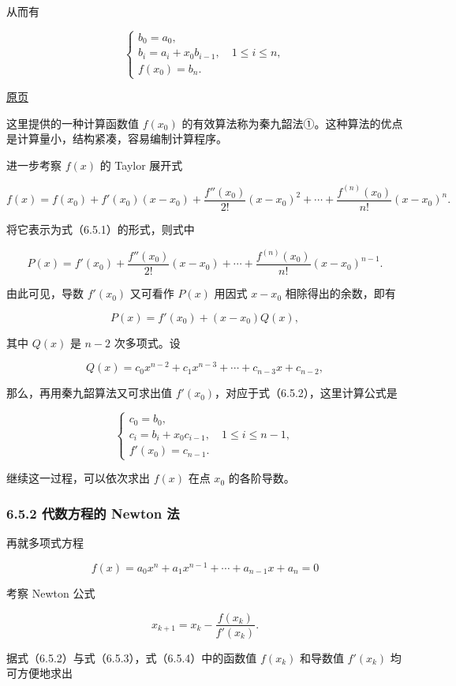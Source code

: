 \documentclass[
  10pt,
  fontset=fandol]{ctexart}
\begin{document}
从而有

\[
\begin{cases}
b_0=a_0,\\
b_i=a_i+x_0b_{i-1},\quad1\leqslant i\leqslant n,\\
f(x_0)=b_n.
\end{cases}
\tag{6.5.2}
\]

\href{../../source-images/pdf-172.jpeg}{原页}

这里提供的一种计算函数值 \(f(x_0)\) 的有效算法称为秦九韶法①。这种算法的优点是计算量小，结构紧凑，容易编制计算程序。

进一步考察 \(f(x)\) 的 Taylor 展开式

\[
f(x)=f(x_0)+f'(x_0)(x-x_0)+\frac{f''(x_0)}{2!}(x-x_0)^2+\cdots+\frac{f^{(n)}(x_0)}{n!}(x-x_0)^n.
\]

将它表示为式（6.5.1）的形式，则式中

\[
P(x)=f'(x_0)+\frac{f''(x_0)}{2!}(x-x_0)+\cdots+\frac{f^{(n)}(x_0)}{n!}(x-x_0)^{n-1}.
\]

由此可见，导数 \(f'(x_0)\) 又可看作 \(P(x)\) 用因式 \(x-x_0\) 相除得出的余数，即有

\[
P(x)=f'(x_0)+(x-x_0)Q(x),
\]

其中 \(Q(x)\) 是 \(n-2\) 次多项式。设

\[
Q(x)=c_0x^{n-2}+c_1x^{n-3}+\cdots+c_{n-3}x+c_{n-2},
\]

那么，再用秦九韶算法又可求出值 \(f'(x_0)\)，对应于式（6.5.2），这里计算公式是

\[
\begin{cases}
c_0=b_0,\\
c_i=b_i+x_0c_{i-1},\quad1\leqslant i\leqslant n-1,\\
f'(x_0)=c_{n-1}.
\end{cases}
\tag{6.5.3}
\]

继续这一过程，可以依次求出 \(f(x)\) 在点 \(x_0\) 的各阶导数。

\subsubsection{6.5.2 代数方程的 Newton 法}\label{ux4ee3ux6570ux65b9ux7a0bux7684-newton-ux6cd5}

再就多项式方程

\[
f(x)=a_0x^n+a_1x^{n-1}+\cdots+a_{n-1}x+a_n=0
\]

考察 Newton 公式

\[
x_{k+1}=x_k-\frac{f(x_k)}{f'(x_k)}.
\tag{6.5.4}
\]

据式（6.5.2）与式（6.5.3），式（6.5.4）中的函数值 \(f(x_k)\) 和导数值 \(f'(x_k)\) 均可方便地求出
\end{document}
